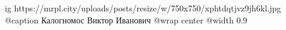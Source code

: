  
 
 
 
 

\ifcmt
  ig https://mrpl.city/uploads/posts/resize/w/750x750/xphtdqtjvz9jh6kl.jpg
	@caption Калогномос Виктор Иванович
  @wrap center
  @width 0.9
\fi
